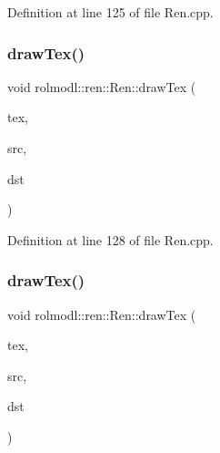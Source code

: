 Definition at line 125 of file Ren.\+cpp.

\mbox{\label{classrolmodl_1_1blend_mode_1_1_ren_a55812779fcc4754a232d15615657e154}} 
\subsubsection{\texorpdfstring{drawTex()}{drawTex()}\hspace{0.1cm}{\footnotesize\ttfamily [8/36]}}
{\footnotesize\ttfamily void rolmodl\+::ren\+::\+Ren\+::draw\+Tex (\begin{DoxyParamCaption}\item[{Tex \&}]{tex,  }\item[{const \mbox{\hyperlink{structrolmodl_1_1blend_mode_1_1_src_rect_x_y}{Src\+Rect\+XY}}}]{src,  }\item[{const \mbox{\hyperlink{structrolmodl_1_1blend_mode_1_1_dst_rect_w_h}{Dst\+Rect\+WH}}}]{dst }\end{DoxyParamCaption})}



Definition at line 128 of file Ren.\+cpp.

\mbox{\label{classrolmodl_1_1blend_mode_1_1_ren_a321171aab3a41715572a3d8fe0e557dd}} 
\subsubsection{\texorpdfstring{drawTex()}{drawTex()}\hspace{0.1cm}{\footnotesize\ttfamily [9/36]}}
{\footnotesize\ttfamily void rolmodl\+::ren\+::\+Ren\+::draw\+Tex (\begin{DoxyParamCaption}\item[{Tex \&}]{tex,  }\item[{const \mbox{\hyperlink{structrolmodl_1_1blend_mode_1_1_src_rect_x_y}{Src\+Rect\+XY}}}]{src,  }\item[{const \mbox{\hyperlink{structrolmodl_1_1blend_mode_1_1_dst_rect_x_y}{Dst\+Rect\+XY}}}]{dst }\end{DoxyParamCaption})}



